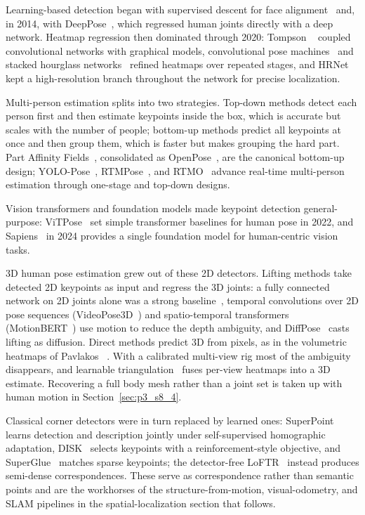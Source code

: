 Learning-based detection began with supervised descent for face alignment~\cite{xiong2013supervised} and, in 2014, with DeepPose~\cite{toshev2014deeppose}, which regressed human joints directly with a deep network.
Heatmap regression then dominated through 2020: Tompson \etal~\cite{tompson2014joint,tompson2015efficient} coupled convolutional networks with graphical models, convolutional pose machines~\cite{wei2016convolutional} and stacked hourglass networks~\cite{newell2016stacked} refined heatmaps over repeated stages, and HRNet~\cite{wang2020deep} kept a high-resolution branch throughout the network for precise localization.


Multi-person estimation splits into two strategies. Top-down methods detect each person first and then estimate keypoints inside the box, which is accurate but scales with the number of people; bottom-up methods predict all keypoints at once and then group them, which is faster but makes grouping the hard part.
Part Affinity Fields~\cite{cao2017realtime}, consolidated as OpenPose~\cite{CaoHSWS21}, are the canonical bottom-up design; YOLO-Pose~\cite{maji2022yolo}, RTMPose~\cite{jiang2023rtmpose}, and RTMO~\cite{lu2024rtmo} advance real-time multi-person estimation through one-stage and top-down designs.


Vision transformers and foundation models made keypoint detection general-purpose: ViTPose~\cite{xu2022vitpose} set simple transformer baselines for human pose in 2022, and Sapiens~\cite{khirodkar2024sapiens} in 2024 provides a single foundation model for human-centric vision tasks.

3D human pose estimation grew out of these 2D detectors. Lifting methods take detected 2D keypoints as input and regress the 3D joints: a fully connected network on 2D joints alone was a strong baseline~\cite{martinez2017simple}, temporal convolutions over 2D pose sequences (VideoPose3D~\cite{pavllo2019videopose3d}) and spatio-temporal transformers (MotionBERT~\cite{zhu2023motionbert}) use motion to reduce the depth ambiguity, and DiffPose~\cite{gong2023diffpose} casts lifting as diffusion. Direct methods predict 3D from pixels, as in the volumetric heatmaps of Pavlakos \etal~\cite{pavlakos2017coarse}. With a calibrated multi-view rig most of the ambiguity disappears, and learnable triangulation~\cite{iskakov2019learnable} fuses per-view heatmaps into a 3D estimate. Recovering a full body mesh rather than a joint set is taken up with human motion in Section~\ref{sec:p3_s8_4}.


Classical corner detectors were in turn replaced by learned ones: SuperPoint~\cite{detone2018superpoint} learns detection and description jointly under self-supervised homographic adaptation, DISK~\cite{tyszkiewicz2020disk} selects keypoints with a reinforcement-style objective, and SuperGlue~\cite{sarlin2020superglue} matches sparse keypoints; the detector-free LoFTR~\cite{Sun2021LoFTR} instead produces semi-dense correspondences.
These serve as correspondence rather than semantic points and are the workhorses of the structure-from-motion, visual-odometry, and SLAM pipelines in the spatial-localization section that follows.

